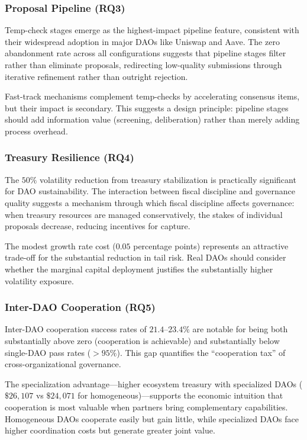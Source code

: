 \subsubsection{Proposal Pipeline (RQ3)}

Temp-check stages emerge as the highest-impact pipeline feature, consistent with their widespread adoption in major DAOs like Uniswap and Aave. The zero abandonment rate across all configurations suggests that pipeline stages filter rather than eliminate proposals, redirecting low-quality submissions through iterative refinement rather than outright rejection.

Fast-track mechanisms complement temp-checks by accelerating consensus items, but their impact is secondary. This suggests a design principle: pipeline stages should add information value (screening, deliberation) rather than merely adding process overhead.

\subsubsection{Treasury Resilience (RQ4)}

The $50\%$ volatility reduction from treasury stabilization is practically significant for DAO sustainability. The interaction between fiscal discipline and governance quality suggests a mechanism through which fiscal discipline affects governance: when treasury resources are managed conservatively, the stakes of individual proposals decrease, reducing incentives for capture.

The modest growth rate cost ($0.05$ percentage points) represents an attractive trade-off for the substantial reduction in tail risk. Real DAOs should consider whether the marginal capital deployment justifies the substantially higher volatility exposure.

\subsubsection{Inter-DAO Cooperation (RQ5)}

Inter-DAO cooperation success rates of $21.4$--$23.4\%$ are notable for being both substantially above zero (cooperation is achievable) and substantially below single-DAO pass rates ($>95\%$). This gap quantifies the ``cooperation tax'' of cross-organizational governance.

The specialization advantage---higher ecosystem treasury with specialized DAOs ($\$26{,}107$ vs $\$24{,}071$ for homogeneous)---supports the economic intuition that cooperation is most valuable when partners bring complementary capabilities. Homogeneous DAOs cooperate easily but gain little, while specialized DAOs face higher coordination costs but generate greater joint value.

